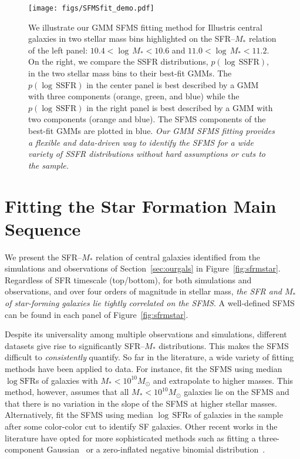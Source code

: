 \documentclass[preprint2,tighten]{aastex62}
\begin{document}
\begin{figure*}
\begin{center}
\texttt{[image: figs/SFMSfit\_demo.pdf]} 
\caption{
We illustrate our GMM SFMS fitting method for Illustris central galaxies in two 
stellar mass bins highlighted on the SFR--$M_*$ relation of the left panel: 
$10.4 < \log\,M_* < 10.6$ and $11.0 < \log\,M_* < 11.2$. On the right, we compare the SSFR 
distributions, $p(\log\,\mathrm{SSFR})$, in the two stellar 
mass bins to their best-fit GMMs. The $p(\log\,\mathrm{SSFR})$ in the center panel is best described by a 
GMM with three components (orange, green, and blue) while the
$p(\log\,\mathrm{SSFR})$ in the right panel is best described by 
a GMM with two components (orange and blue). The SFMS components of the 
best-fit GMMs are plotted in blue. \emph{Our GMM SFMS fitting provides
a flexible and data-driven way to identify the SFMS for a wide variety 
of SSFR distributions without hard assumptions or cuts to the sample.}
}\label{fig:fitdemo}
\end{center}
\end{figure*}

\section{Fitting the Star Formation Main Sequence}\label{sec:sfmsfit}
We present the SFR--$M_*$ relation of central galaxies identified 
from the simulations and observations of Section~\ref{sec:ourgals} in 
Figure~\ref{fig:sfrmstar}. Regardless of SFR timescale (top/bottom),
for both simulations and observations, and over four orders of magnitude 
in stellar mass, \emph{the SFR and $M_*$ of star-forming galaxies lie 
tightly correlated on the SFMS}. A well-defined SFMS can be found in 
each panel of Figure~\ref{fig:sfrmstar}.

Despite its universality among multiple observations and simulations, 
different datasets give rise to significantly SFR--$M_*$ distributions.
This makes the SFMS difficult to \emph{consistently} quantify. So far 
in the literature, a wide variety 
of fitting methods have been applied to data. For instance, \cite{bluck2016} 
fit the SFMS using median $\log\mathrm{SFR}$s of galaxies with 
$M_* < 10^{10}M_\odot$ and extrapolate to higher masses. This method, however, 
assumes that all $M_* < 10^{10}M_\odot$ galaxies lie on the SFMS and that 
there is no variation in the slope of the SFMS at higher stellar masses. 
Alternatively, \cite{lee2015} fit the SFMS using median 
$\log\,\mathrm{SFR}$s of galaxies in the sample after some color-color cut 
to identify SF galaxies. Other recent works in the literature have opted 
for more sophisticated methods such as fitting a three-component
Gaussian~\citep{bisigello2018} or a zero-inflated negative binomial 
distribution~\citep{feldmann2017}. 
\end{document}
